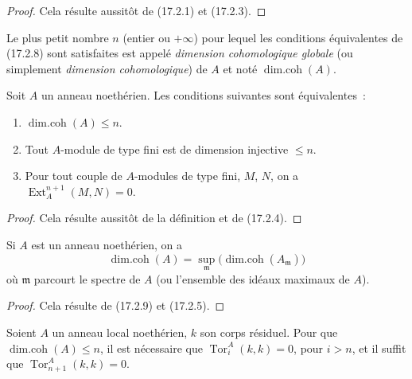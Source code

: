 \begin{proof}
Cela résulte aussitôt de (17.2.1) et (17.2.3).
\end{proof}

Le plus petit nombre $n$ (entier ou $+\infty$) pour lequel les conditions
équivalentes de (17.2.8) sont satisfaites est appelé \emph{dimension
cohomologique globale} (ou simplement \emph{dimension cohomologique}) de $A$
et noté $\operatorname{dim.coh}(A)$.

\begin{proposition}[17.2.9]
\label{0.17.2.9-fr}
Soit $A$ un anneau noethérien. Les conditions suivantes sont équivalentes~:
\begin{enumerate}
  \item[\rm a)] $\operatorname{dim.coh}(A)\leq n$.
  \item[\rm b)] Tout $A$-module de type fini est de dimension injective
  $\leq n$.
  \item[\rm c)] Pour tout couple de $A$-modules de type fini, $M$, $N$, on a
  $\operatorname{Ext}^{n+1}_A(M,N)=0$.
\end{enumerate}
\end{proposition}

\begin{proof}
Cela résulte aussitôt de la définition et de (17.2.4).
\end{proof}

\begin{corollary}[17.2.10]
\label{0.17.2.10-fr}
Si $A$ est un anneau noethérien, on a
\begin{equation}
\label{0.17.2.10.1-fr}
\tag{17.2.10.1}
  \operatorname{dim.coh}(A)
  =\sup_{\mathfrak{m}}
  \bigl(\operatorname{dim.coh}(A_{\mathfrak{m}})\bigr)
\end{equation}
où $\mathfrak{m}$ parcourt le spectre de $A$ (ou l'ensemble des idéaux
maximaux de $A$).
\end{corollary}

\begin{proof}
Cela résulte de (17.2.9) et (17.2.5).
\end{proof}

\begin{proposition}[17.2.11]
\label{0.17.2.11-fr}
Soient $A$ un anneau local noethérien, $k$ son corps résiduel. Pour que
$\operatorname{dim.coh}(A)\leq n$, il est nécessaire que
$\operatorname{Tor}^A_i(k,k)=0$, pour $i>n$, et il suffit que
$\operatorname{Tor}^A_{n+1}(k,k)=0$.
\end{proposition}

